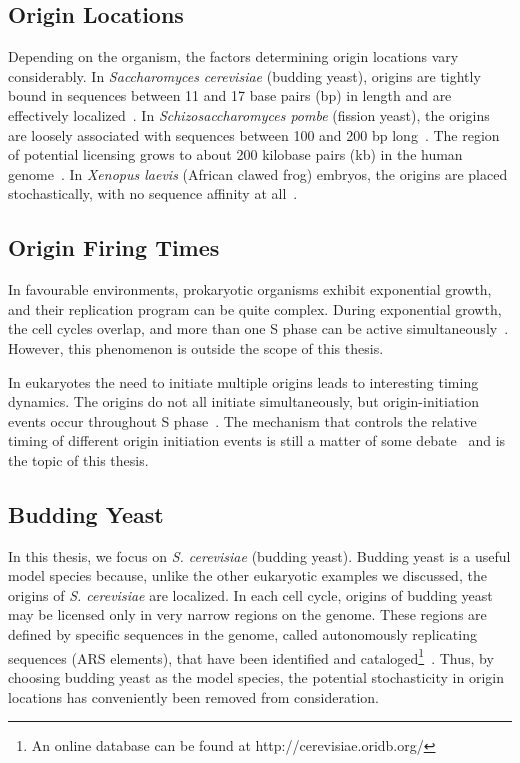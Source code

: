 	
		\subsection{Origin Locations}
		\label{subsec:OriginLocations}
		
		Depending on the organism, the factors determining origin locations vary considerably.
		In \emph{Saccharomyces cerevisiae} (budding yeast), origins are tightly bound in sequences between 11 and 17 base pairs (bp) in length and are effectively localized~\cite{ScottsPaper}.
		In \emph{Schizosaccharomyces pombe} (fission yeast), the origins are loosely associated with sequences between 100 and 200 bp long~\cite{OriginsReview}.
		The region of potential licensing grows to about 200 kilobase pairs (kb) in the human genome~\cite{HumanGenome}.
		In \emph{Xenopus laevis} (African clawed frog) embryos, the origins are placed stochastically, with no sequence affinity at all~\cite{FrogEmbryo}.
		
		
		\subsection{Origin Firing Times}
		\label{subsec:OriginTimes}
		
		In favourable environments, prokaryotic organisms exhibit exponential growth, and their replication program can be quite complex.
		During exponential growth, the cell cycles overlap, and more than one S phase can be active simultaneously~\cite{ExponentialGrowth}.
		However, this phenomenon is outside the scope of this thesis.
		
		In eukaryotes the  need to initiate multiple origins leads to interesting timing dynamics.
		The origins do not all initiate simultaneously, but origin-initiation events occur throughout S phase~\cite{DNAInitiation}.
		The mechanism that controls the relative timing of different origin initiation events is still a matter of some debate~\cite{ScottsPaper,Bechhoefer2012374,deMouraModel2,deMouraModel1} and is the topic of this thesis.
		
		
		\subsection{Budding Yeast}
		\label{subsec:BuddingYeast}
		
		In this thesis, we focus on \emph{S. cerevisiae} (budding yeast).
		Budding yeast is a useful model species because, unlike the other eukaryotic examples we discussed, the origins of \emph{S. cerevisiae} are localized.
		In each cell cycle, origins of budding yeast may be licensed only in very narrow regions on the genome.
		These regions are defined by specific sequences in the genome, called autonomously replicating sequences (ARS elements), that have been identified and cataloged\footnote{An online database can be found at http://cerevisiae.oridb.org/}~\cite{OriDB}.
		Thus, by choosing budding yeast as the model species, the potential stochasticity in origin locations has conveniently been removed from consideration.
		
